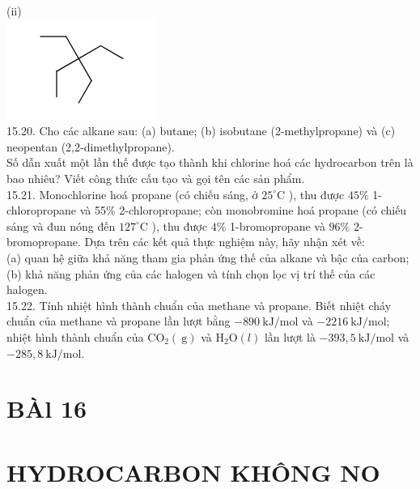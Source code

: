 \documentclass[10pt]{article}
\begin{document}
(ii)\\
\includegraphics{smile-5c3ef0b26c358d213a353df4c838df9ace79b711}\\
15.20. Cho các alkane sau: (a) butane; (b) isobutane (2-methylpropane) và (c) neopentan (2,2-dimethylpropane).\\
Số dẫn xuất một lần thế được tạo thành khi chlorine hoá các hydrocarbon trên là bao nhiêu? Viết công thức cấu tạo và gọi tên các sản phẩm.\\
15.21. Monochlorine hoá propane (có chiếu sáng, ở $25^{\circ} \mathrm{C}$ ), thu được $45 \%$ 1-chloropropane và 55\% 2-chloropropane; còn monobromine hoá propane (có chiếu sáng và đun nóng đến $127^{\circ} \mathrm{C}$ ), thu được $4 \%$ 1-bromopropane và $96 \%$ 2-bromopropane. Dựa trên các kết quả thực nghiệm này, hãy nhận xét về:\\
(a) quan hệ giữa khả năng tham gia phản ứng thế của alkane và bậc của carbon;\\
(b) khả năng phản ứng của các halogen và tính chọn lọc vị trí thế của các halogen.\\
15.22. Tính nhiệt hình thành chuẩn của methane và propane. Biết nhiệt cháy chuẩn của methane và propane lần lượt bằng $-890 \mathrm{~kJ} / \mathrm{mol}$ và $-2216 \mathrm{~kJ} / \mathrm{mol}$; nhiệt hình thành chuẩn của $\mathrm{CO}_{2}(\mathrm{~g})$ và $\mathrm{H}_{2} \mathrm{O}(l)$ lần lượt là $-393,5 \mathrm{~kJ} / \mathrm{mol}$ và $-285,8 \mathrm{~kJ} / \mathrm{mol}$.

\section*{BÀl 16}
\section*{HYDROCARBON KHÔNG NO}
\end{document}
